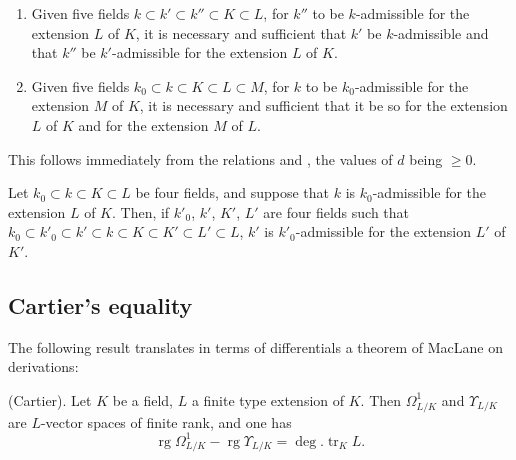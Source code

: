 \begin{corollary}[21.6.5]
\label{0.21.6.5}
\begin{enumerate}
  \item[\rm (i)] Given five fields $k\subset k'\subset k''\subset K\subset L$, for $k''$ to be $k$-admissible for the extension $L$ of $K$, it is necessary and sufficient that $k'$ be $k$-admissible and that $k''$ be $k'$-admissible for the extension $L$ of $K$.
  \item[\rm (ii)] Given five fields $k_0\subset k\subset K\subset L\subset M$, for $k$ to be $k_0$-admissible for the extension $M$ of $K$, it is necessary and sufficient that it be so for the extension $L$ of $K$ and for the extension $M$ of $L$.
\end{enumerate}

This follows immediately from the relations  and , the values of $d$ being $\geqslant 0$.
\end{corollary}

\begin{corollary}[21.6.6]
\label{0.21.6.6}
Let $k_0\subset k\subset K\subset L$ be four fields, and suppose that $k$ is $k_0$-admissible for the extension $L$ of $K$.
Then, if $k'_0$, $k'$, $K'$, $L'$ are four fields such that $k_0\subset k'_0\subset k'\subset k\subset K\subset K'\subset L'\subset L$, $k'$ is $k'_0$-admissible for the extension $L'$ of $K'$.
\end{corollary}

\subsection{Cartier's equality}
\label{subsection:0.21.7}

The following result translates in terms of differentials a theorem of MacLane on derivations:

\begin{theorem}[21.7.1]
\label{0.21.7.1}
\textnormal{(Cartier).}
Let $K$ be a field, $L$ a finite type extension of $K$.
Then $\Omega^1_{L/K}$ and $\Upsilon_{L/K}$ are $L$-vector spaces of finite rank, and one has
\begin{equation}
\tag{21.7.1.1}
  \label{0.21.7.1.1}
  \operatorname{rg}\Omega^1_{L/K}-\operatorname{rg}\Upsilon_{L/K}=\deg.\operatorname{tr}_K L.
\end{equation}
\end{theorem}


